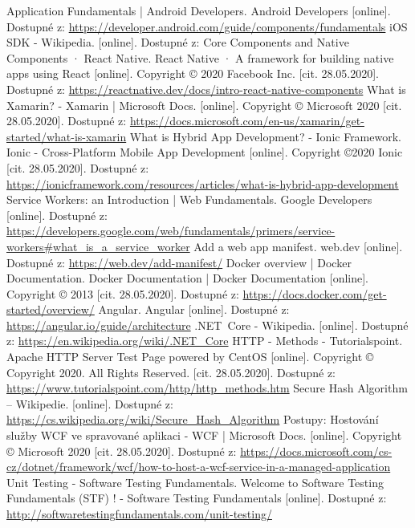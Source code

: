 \documentclass[
  glossaries,
]{kidiplom}
\begin{document}
\begin{thebibliography}{9}
Application Fundamentals | Android Developers. Android Developers [online]. Dostupné z: \url{https://developer.android.com/guide/components/fundamentals}
iOS SDK - Wikipedia. [online]. Dostupné z: \href{https://en.wikipedia.org/wiki/IOS\_SDK/}
     Core Components and Native Components · React Native. React Native · A framework for building native apps using React [online]. Copyright © 2020 Facebook Inc. [cit. 28.05.2020]. Dostupné z: \url{https://reactnative.dev/docs/intro-react-native-components}
     What is Xamarin? - Xamarin | Microsoft Docs. [online]. Copyright © Microsoft 2020 [cit. 28.05.2020]. Dostupné z: \url{https://docs.microsoft.com/en-us/xamarin/get-started/what-is-xamarin}
     What is Hybrid App Development? - Ionic Framework. Ionic - Cross-Platform Mobile App Development [online]. Copyright ©2020 Ionic [cit. 28.05.2020]. Dostupné z: \url{https://ionicframework.com/resources/articles/what-is-hybrid-app-development}
     Service Workers: an Introduction  |  Web Fundamentals. Google Developers [online]. Dostupné z: \url{https://developers.google.com/web/fundamentals/primers/service-workers\#what\_is\_a\_service\_worker}
     Add a web app manifest. web.dev [online]. Dostupné z: \url{https://web.dev/add-manifest/}
     Docker overview | Docker Documentation. Docker Documentation | Docker Documentation [online]. Copyright © 2013 [cit. 28.05.2020]. Dostupné z:  \url{https://docs.docker.com/get-started/overview/}
     Angular. Angular [online]. Dostupné z:  \url{https://angular.io/guide/architecture}
     .NET\ Core - Wikipedia. [online]. Dostupné z: \url{https://en.wikipedia.org/wiki/.NET\_Core}
     HTTP - Methods - Tutorialspoint. Apache HTTP Server Test Page powered by CentOS [online]. Copyright © Copyright 2020. All Rights Reserved. [cit. 28.05.2020]. Dostupné z: \url{https://www.tutorialspoint.com/http/http\_methods.htm}
     Secure Hash Algorithm – Wikipedie. [online]. Dostupné z: \url{https://cs.wikipedia.org/wiki/Secure\_Hash\_Algorithm}
     Postupy: Hostování služby WCF ve spravované aplikaci - WCF | Microsoft Docs. [online]. Copyright © Microsoft 2020 [cit. 28.05.2020]. Dostupné z: \url{https://docs.microsoft.com/cs-cz/dotnet/framework/wcf/how-to-host-a-wcf-service-in-a-managed-application}
     Unit Testing - Software Testing Fundamentals. Welcome to Software Testing Fundamentals (STF) ! - Software Testing Fundamentals [online]. Dostupné z: \url{http://softwaretestingfundamentals.com/unit-testing/}

\end{thebibliography}
\end{document}

